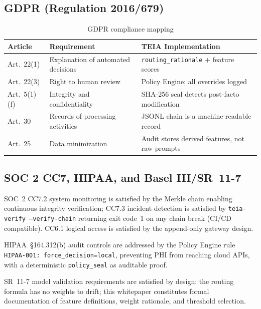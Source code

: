 \documentclass[11pt,a4paper]{article}
\newcommand{\teia}{\textsc{TEIA}}
\begin{document}
\subsection{GDPR (Regulation 2016/679)}

\begin{table}[h]
\centering
\caption{GDPR compliance mapping}
\label{tab:gdpr}
\begin{tabular}{@{}p{2.0cm}p{4.4cm}p{5.4cm}@{}}
\toprule
Article & Requirement & \teia{} Implementation \\
\midrule
Art.~22(1) & Explanation of automated decisions &
  \texttt{routing\_rationale} + feature scores \\[2pt]
Art.~22(3) & Right to human review &
  Policy Engine; all overrides logged \\[2pt]
Art.~5(1)(f) & Integrity and confidentiality &
  SHA-256 seal detects post-facto modification \\[2pt]
Art.~30 & Records of processing activities &
  JSONL chain is a machine-readable record \\[2pt]
Art.~25 & Data minimization &
  Audit stores derived features, not raw prompts \\
\bottomrule
\end{tabular}
\end{table}

\subsection{SOC 2 CC7, HIPAA, and Basel III/SR~11-7}

SOC~2 CC7.2 system monitoring is satisfied by the Merkle chain enabling continuous
integrity verification; CC7.3 incident detection is satisfied by
\texttt{teia-verify --verify-chain} returning exit code~1 on any chain break (CI/CD
compatible). CC6.1 logical access is satisfied by the append-only gateway design.

HIPAA~\S164.312(b) audit controls are addressed by the Policy Engine rule
\texttt{HIPAA-001: force\_decision=local}, preventing PHI from reaching cloud APIs,
with a deterministic \texttt{policy\_seal} as auditable proof.

SR~11-7 model validation requirements are satisfied by design: the routing formula
has no weights to drift; this whitepaper constitutes formal documentation of feature
definitions, weight rationale, and threshold selection.

\end{document}

